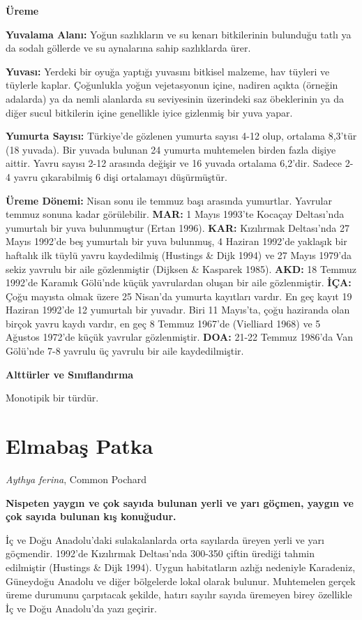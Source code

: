 \documentclass[
  letterpaper,
  DIV=11,
  numbers=noendperiod]{scrreprt}
\begin{document}
\textbf{Üreme}

\textbf{Yuvalama Alanı:} Yoğun sazlıkların ve su kenarı bitkilerinin
bulunduğu tatlı ya da sodalı göllerde ve su aynalarına sahip sazlıklarda
ürer.

\textbf{Yuvası:} Yerdeki bir oyuğa yaptığı yuvasını bitkisel malzeme,
hav tüyleri ve tüylerle kaplar. Çoğunlukla yoğun vejetasyonun içine,
nadiren açıkta (örneğin adalarda) ya da nemli alanlarda su seviyesinin
üzerindeki saz öbeklerinin ya da diğer sucul bitkilerin içine genellikle
iyice gizlenmiş bir yuva yapar.

\textbf{Yumurta Sayısı:} Türkiye'de gözlenen yumurta sayısı 4-12 olup,
ortalama 8,3'tür (18 yuvada). Bir yuvada bulunan 24 yumurta muhtemelen
birden fazla dişiye aittir. Yavru sayısı 2-12 arasında değişir ve 16
yuvada ortalama 6,2'dir. Sadece 2-4 yavru çıkarabilmiş 6 dişi ortalamayı
düşürmüştür.

\textbf{Üreme Dönemi:} Nisan sonu ile temmuz başı arasında yumurtlar.
Yavrular temmuz sonuna kadar görülebilir. \textbf{MAR:} 1 Mayıs 1993'te
Kocaçay Deltası'nda yumurtalı bir yuva bulunmuştur (Ertan 1996).
\textbf{KAR:} Kızılırmak Deltası'nda 27 Mayıs 1992'de beş yumurtalı bir
yuva bulunmuş, 4 Haziran 1992'de yaklaşık bir haftalık ilk tüylü yavru
kaydedilmiş (Hustings \& Dijk 1994) ve 27 Mayıs 1979'da sekiz yavrulu
bir aile gözlenmiştir (Dijksen \& Kasparek 1985). \textbf{AKD:} 18
Temmuz 1992'de Karamık Gölü'nde küçük yavrulardan oluşan bir aile
gözlenmiştir. \textbf{İÇA:} Çoğu mayısta olmak üzere 25 Nisan'da yumurta
kayıtları vardır. En geç kayıt 19 Haziran 1992'de 12 yumurtalı bir
yuvadır. Biri 11 Mayıs'ta, çoğu haziranda olan birçok yavru kaydı
vardır, en geç 8 Temmuz 1967'de (Vielliard 1968) ve 5 Ağustos 1972'de
küçük yavrular gözlenmiştir. \textbf{DOA:} 21-22 Temmuz 1986'da Van
Gölü'nde 7-8 yavrulu üç yavrulu bir aile kaydedilmiştir.

\textbf{Alttürler ve Sınıflandırma}

Monotipik bir türdür.

\section{Elmabaş Patka}\label{elmabaux15f-patka}

\emph{Aythya ferina}, Common Pochard

\textbf{Nispeten yaygın ve çok sayıda bulunan yerli ve yarı göçmen,
yaygın ve çok sayıda bulunan kış konuğudur.}

İç ve Doğu Anadolu'daki sulakalanlarda orta sayılarda üreyen yerli ve
yarı göçmendir. 1992'de Kızılırmak Deltası'nda 300-350 çiftin ürediği
tahmin edilmiştir (Hustings \& Dijk 1994). Uygun habitatların azlığı
nedeniyle Karadeniz, Güneydoğu Anadolu ve diğer bölgelerde lokal olarak
bulunur. Muhtemelen gerçek üreme durumunu çarpıtacak şekilde, hatırı
sayılır sayıda üremeyen birey özellikle İç ve Doğu Anadolu'da yazı
geçirir.
\end{document}
